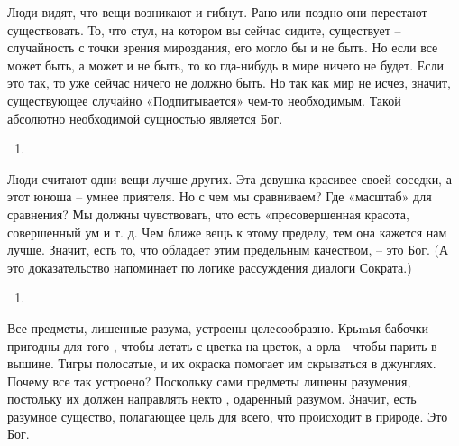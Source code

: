 \documentclass[
]{article}
\providecommand{\tightlist}{%
  \setlength{\itemsep}{0pt}\setlength{\parskip}{0pt}}
\begin{document}
Люди видят, что вещи возникают и гибнут. Рано или поздно они перестают
существовать. То, что стул, на котором вы сейчас сидите, существует --
случайность с точки зрения мироздания, его могло бы и не быть. Но если
все может быть, а может и не быть, то ко­ гда-нибудь в мире ничего не
будет. Если это так, то уже сейчас ничего не должно быть. Но так как мир
не исчез, значит, существующее случайно «Подпитывается» чем-то
необходимым. Такой абсолютно необходимой сущностью является Бог.

\begin{enumerate}
\def\labelenumi{\arabic{enumi}.}
\setcounter{enumi}{3}
\item
\end{enumerate}

Люди считают одни вещи лучше других. Эта девушка красивее своей соседки,
а этот юноша -- умнее приятеля. Но с чем мы сравниваем? Где «масштаб»
для сравнения? Мы должны чувствовать, что есть «пресовершенная красота,
совершенный ум и т. д. Чем ближе вещь к этому пределу, тем она кажется
нам лучше. Значит, есть то, что обладает этим предельным качеством, --
это Бог. (А это доказательство напоминает по логике рассуждения диалоги
Сократа.)

\begin{enumerate}
\def\labelenumi{\arabic{enumi}.}
\setcounter{enumi}{4}
\item
\end{enumerate}

Все предметы, лишенные разума, устроены целесообразно. Крьmья бабочки
пригодны для того , чтобы летать с цветка на цветок, а орла - чтобы
парить в вышине. Тигры полосатые, и их окраска помогает им скрываться в
джунглях. Почему все так устроено? Поскольку сами предметы лишены
разумения, постольку их должен направлять некто , одаренный разумом.
Значит, есть разумное существо, полагающее цель для всего, что
происходит в природе. Это Бог.
\end{document}
